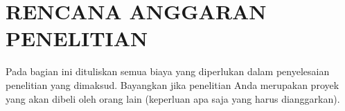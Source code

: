 \chapter*{RENCANA ANGGARAN PENELITIAN}
Pada bagian ini dituliskan semua biaya yang diperlukan dalam penyelesaian  penelitian yang dimaksud. Bayangkan jika penelitian Anda merupakan proyek yang akan dibeli oleh orang lain (keperluan apa saja yang harus dianggarkan).